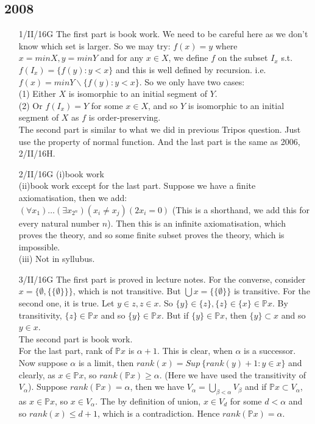 \subsection{2008}
\begin{enumerate}
\item[1/II/16G] The first part is book work. We need to be careful here as we don't know which set is larger. So we may try: $f(x)=y$ where $x =min X, y = min Y$ and for any $x \in X$, we define $f$ on the subset $I_x$ s.t. $f(I_x) = \{f(y): y < x\}$ and this is well defined by recursion. i.e. $f(x)= min Y \backslash \{f(y): y<x\}$. So we only have two cases:\\
    (1) Either $X$ is isomorphic to an initial segment of $Y$.\\
    (2) Or $f(I_x)=Y$ for some $x \in X$, and so $Y$ is isomorphic to an initial segment of $X$ as $f$ is order-preserving.\\
    The second part is similar to what we did in previous Tripos question. Just use the property of normal function. And the last part is the same as 2006, 2/II/16H.\\
\item[2/II/16G] (i)book work\\
    (ii)book work except for the last part. Suppose we have a finite axiomatisation, then we add:\\
    $(\forall x_1) \ldots (\exists x_{2^n})(x_i \neq x_j)(2 x_i=0)$ (This is a shorthand, we add this for every natural number $n$). Then this is an infinite axiomatisation, which proves the theory, and so some finite subset proves the theory, which is impossible.\\
    (iii) Not in syllubus.\\
\item[3/II/16G] The first part is proved in lecture notes. For the converse, consider $x=\{\emptyset,\{\{\emptyset\}\}\}$, which is not transitive. But $\bigcup x=\{\{\emptyset\}\}$ is transitive.
    For the second one, it is true. Let $y \in z, z \in x$. So $\{y\} \in \{z\}, \{z\} \in \{x\} \in \mathbb{P}x$. By transitivity, $\{z\} \in \mathbb{P}x$ and so $\{y\} \in \mathbb{P}x$. But if $\{y\} \in \mathbb{P}x$, then $\{y\} \subset x$ and so $y \in x$.\\
    The second part is book work.\\
    For the last part, rank of $\mathbb{P}x$ is $\alpha+1$. This is clear, when $\alpha$ is a successor. Now suppose $\alpha$ is a limit, then $rank(x)=Sup~\{rank(y)+1: y \in x\}$ and clearly, as $x \in \mathbb{P}x$, so $rank(\mathbb{P}x) \ge \alpha$. (Here we have used the transitivity of $V_\alpha$). Suppose $rank(\mathbb{P}x)=\alpha$, then we have $V_\alpha = \bigcup_{\beta < \alpha}V_\beta$ and if $\mathbb{P}x \subset V_\alpha$, as $x \in \mathbb{P}x$, so $x \in V_\alpha$. The by definition of union, $x \in V_d$ for some $d < \alpha$ and so $rank(x) \le d+1$, which is a contradiction. Hence $rank(\mathbb{P}x)=\alpha$.\\

\end{enumerate}
